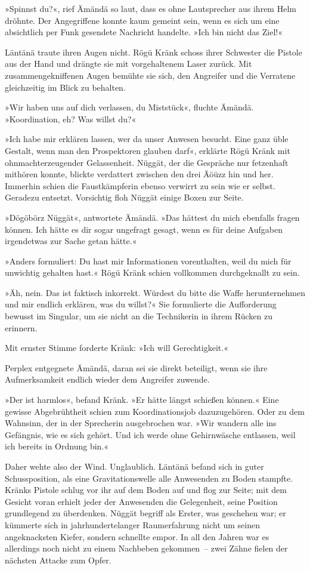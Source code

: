 »Spinnst du?«, rief Ämändä so laut, dass es ohne Lautsprecher aus ihrem Helm dröhnte. Der Angegriffene konnte kaum gemeint sein, wenn es sich um eine absichtlich per Funk gesendete Nachricht handelte. »Ich bin nicht das Ziel!«

Läntänä traute ihren Augen nicht. Rögü Kränk schoss ihrer Schwester die Pistole aus der Hand und drängte sie mit vorgehaltenem Laser zurück. Mit zusammengekniffenen Augen bemühte sie sich, den Angreifer und die Verratene gleichzeitig im Blick zu behalten.

»Wir haben uns auf dich verlassen, du Miststück«, fluchte Ämändä. »Koordination, eh? Was willst du?«

»Ich habe mir erklären lassen, wer da unser Anwesen besucht. Eine ganz üble Gestalt, wenn man den Prospektoren glauben darf«, erklärte Rögü Kränk mit ohnmachterzeugender Gelassenheit. Nüggät, der die Gespräche nur fetzenhaft mithören konnte, blickte verdattert zwischen den drei Äöüzz hin und her. Immerhin schien die Faustkämpferin ebenso verwirrt zu sein wie er selbst. Geradezu entsetzt. Vorsichtig floh Nüggät einige Boxen zur Seite.

»Dögöbörz Nüggät«, antwortete Ämändä. »Das hättest du mich ebenfalls fragen können. Ich hätte es dir sogar ungefragt gesagt, wenn es für deine Aufgaben irgendetwas zur Sache getan hätte.«

»Anders formuliert: Du hast mir Informationen vorenthalten, weil du mich für unwichtig gehalten hast.« Rögü Kränk schien vollkommen durchgeknallt zu sein.

»Äh, nein. Das ist faktisch inkorrekt. Würdest du bitte die Waffe herunternehmen und mir endlich erklären, was du willst?« Sie formulierte die Aufforderung bewusst im Singular, um sie nicht an die Technikerin in ihrem Rücken zu erinnern.

Mit ernster Stimme forderte Kränk: »Ich will Gerechtigkeit.«

Perplex entgegnete Ämändä, daran sei sie direkt beteiligt, wenn sie ihre Aufmerksamkeit endlich wieder dem Angreifer zuwende.

»Der ist harmlos«, befand Kränk. »Er hätte längst schießen können.« Eine gewisse Abgebrühtheit schien zum Koordinationsjob dazuzugehören. Oder zu dem Wahnsinn, der in der Sprecherin ausgebrochen war. »Wir wandern alle ins Gefängnis, wie es sich gehört. Und ich werde ohne Gehirnwäsche entlassen, weil ich bereits in Ordnung bin.«

Daher wehte also der Wind. Unglaublich. Läntänä befand sich in guter Schussposition, als eine Gravitationswelle alle Anwesenden zu Boden stampfte. Kränks Pistole schlug vor ihr auf dem Boden auf und flog zur Seite; mit dem Gesicht voran erhielt jeder der Anwesenden die Gelegenheit, seine Position grundlegend zu überdenken. Nüggät begriff als Erster, was geschehen war; er kümmerte sich in jahrhundertelanger Raumerfahrung nicht um seinen angeknacksten Kiefer, sondern schnellte empor. In all den Jahren war es allerdings noch nicht zu einem Nachbeben gekommen~– zwei Zähne fielen der nächsten Attacke zum Opfer.

